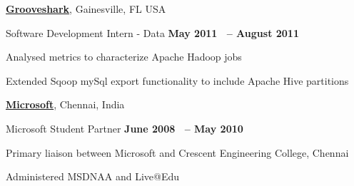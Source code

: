 \documentclass[10pt]{article}
\renewcommand\textit[1]{#1}
\newenvironment{outerlist}[1][\enskip\textbullet]%
        {\begin{itemize}[#1]}{\end{itemize}%
         \vspace{-.6\baselineskip}}
\newenvironment{innerlist}[1][\enskip\textbullet]%
        {\begin{compactitem}[#1]}{\end{compactitem}}
\newcommand{\halfblankline}{\quad\vspace{-0.5\baselineskip}\pagebreak[3]}
\begin{document}
\halfblankline

\href{http://www.grooveshark.com/}{\textbf{Grooveshark}},
Gainesville, FL USA
\begin{outerlist}

\item[] \textit{ Software Development Intern - Data}%
        \hfill \textbf{May 2011 ~-- August 2011}
\begin{innerlist}
\item Analysed metrics to characterize Apache Hadoop jobs
\item Extended Sqoop mySql export functionality to include Apache Hive partitions
\end{innerlist}

\end{outerlist}

\halfblankline


\href{http://www.microsoft.com/}{\textbf{Microsoft}},
Chennai, India
\begin{outerlist}

\item[] \textit{Microsoft Student Partner}%
        \hfill \textbf{June 2008 ~-- May 2010}
\begin{innerlist}
\item Primary liaison between Microsoft and Crescent Engineering College, Chennai
\item Administered MSDNAA and Live@Edu
\end{innerlist}

\end{outerlist}

\halfblankline
\end{document}
